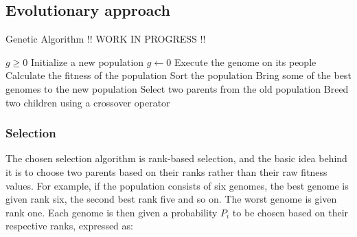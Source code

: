 \subsection{Evolutionary approach}

    \begin{algorithm}
        \caption{Genetic Algorithm !! WORK IN PROGRESS !!}\label{alg:pseudocode_ga}
        \begin{algorithmic}
        \Require $g \geq 0$
        \State Initialize a new population
        \State $g \gets 0$
            \State Execute the genome on its people
        \EndFor
		\State Calculate the fitness of the population
		\State Sort the population
         
			\State Bring some of the best genomes to the new population
        \EndIf
		\State Select two parents from the old population
			\State Breed two children using a crossover operator
		\Else
			\State 
		\EndIf
		\EndWhile
        \EndWhile
        \end{algorithmic}
    \end{algorithm}

\subsubsection{Selection}

    The chosen selection algorithm is rank-based selection, and the basic idea behind it is to choose two parents based on their ranks rather than their raw fitness values. For example, if the population consists of six genomes, the best genome is given rank six, the second best rank five and so on. The worst genome is given rank one. Each genome is then given a probability $ P_i $ to be chosen based on their respective ranks, expressed as:

